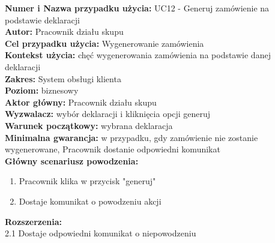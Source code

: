 \textbf{Numer i Nazwa przypadku użycia:} UC12 - Generuj zamówienie na podstawie deklaracji \\
\textbf{Autor:} Pracownik działu skupu\\
\textbf{Cel przypadku użycia:} Wygenerowanie zamówienia \\
\textbf{Kontekst użycia:} chęć wygenerowania zamówienia na podstawie danej deklaracji\\
\textbf{Zakres:} System obsługi klienta \\
\textbf{Poziom:} biznesowy \\
\textbf{Aktor główny:} Pracownik działu skupu\\
\textbf{Wyzwalacz:} wybór deklaracji i kliknięcia opcji generuj \\
\textbf{Warunek początkowy:} wybrana deklaracja \\
\textbf{Minimalna gwarancja:} w przypadku, gdy zamówienie nie zostanie wygenerowane, Pracownik dostanie odpowiedni komunikat \\
\textbf{Główny scenariusz powodzenia:} \\
	\begin{enumerate}
		\item Pracownik klika w przycisk "generuj"
		\item Dostaje komunikat o powodzeniu akcji
	\end{enumerate}
\textbf{Rozszerzenia:} \\
		2.1 Dostaje odpowiedni komunikat o niepowodzeniu
